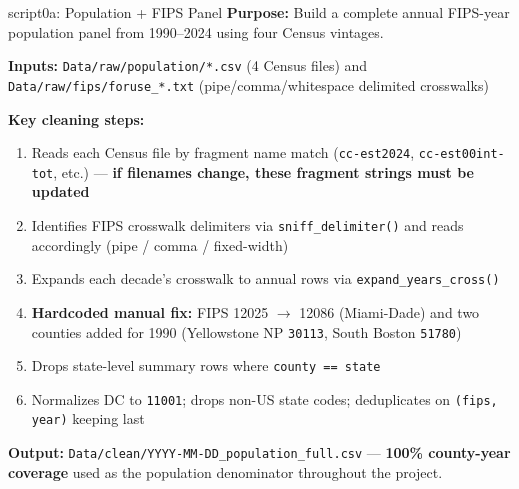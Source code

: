 \documentclass[aspectratio=169]{beamer}
\begin{document}
\begin{frame}{script0a: Population + FIPS Panel}
\textbf{Purpose:} Build a complete annual FIPS-year population panel from 1990--2024 using four Census vintages.

\vspace{0.5em}
\textbf{Inputs:} \texttt{Data/raw/population/*.csv} (4 Census files) and \texttt{Data/raw/fips/foruse\_*.txt} (pipe/comma/whitespace delimited crosswalks)

\vspace{0.5em}
\textbf{Key cleaning steps:}
\begin{enumerate}\small
    \item Reads each Census file by fragment name match (\texttt{cc-est2024}, \texttt{cc-est00int-tot}, etc.) — \textbf{if filenames change, these fragment strings must be updated}
    \item Identifies FIPS crosswalk delimiters via \texttt{sniff\_delimiter()} and reads accordingly (pipe / comma / fixed-width)
    \item Expands each decade's crosswalk to annual rows via \texttt{expand\_years\_cross()}
    \item \textbf{Hardcoded manual fix:} FIPS 12025 $\rightarrow$ 12086 (Miami-Dade) and two counties added for 1990 (Yellowstone NP \texttt{30113}, South Boston \texttt{51780})
    \item Drops state-level summary rows where \texttt{county == state}
    \item Normalizes DC to \texttt{11001}; drops non-US state codes; deduplicates on \texttt{(fips, year)} keeping last
\end{enumerate}

\vspace{0.3em}
\textbf{Output:} \texttt{Data/clean/YYYY-MM-DD\_population\_full.csv} — \textbf{100\% county-year coverage} used as the population denominator throughout the project.
\end{frame}
\end{document}
